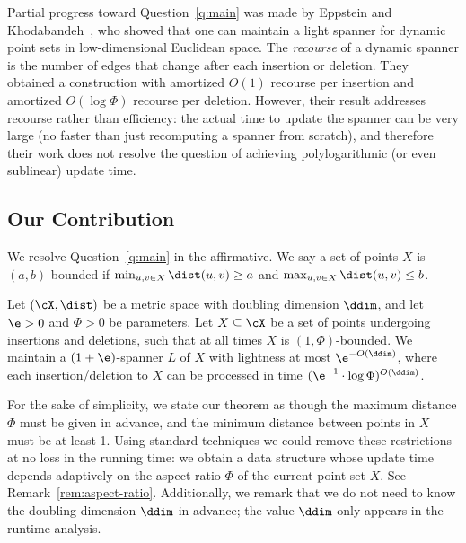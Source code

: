%
%
Partial progress toward Question~\ref{q:main} was made by Eppstein and Khodabandeh~\cite{EK24}, who showed that one can maintain a  light spanner for dynamic point sets in low-dimensional Euclidean space. The \emph{recourse} of a dynamic spanner is the number of edges that change after each insertion or deletion. They obtained a construction with amortized $O(1)$ recourse per insertion and amortized $O(\log \Phi)$ recourse per deletion. However, their result addresses recourse rather than efficiency: the actual time to update the spanner can be very large (no faster than just recomputing a spanner from scratch), and therefore their work does not resolve the question of achieving polylogarithmic (or even sublinear) update time.
%
%
%
%
%
\subsection{Our Contribution}
%
We resolve Question~\ref{q:main} in the affirmative. We say a set of points $X$ is $(a,b)$-bounded if $\min_{u,v \in X} \dist(u,v) \ge a$ and $\max_{u,v \in X} \dist(u,v) \le b$.
\begin{theorem}
\label{thm:main}
    Let $(\cX, \dist)$ be a metric space with doubling dimension $\ddim$, and let $\e >0$ and $\Phi > 0$ be parameters. Let $X \subseteq \cX$ be a set of points undergoing insertions and deletions, such that at all times $X$ is $(1, \Phi)$-bounded. We maintain a $(1+\e)$-spanner $L$ of $X$ with lightness at most $\e^{-O(\ddim)}$, where each insertion/deletion to $X$ can be processed in time $(\e^{-1} \cdot \log \Phi)^{O(\ddim)}$.
\end{theorem}
For the sake of simplicity, we state our theorem as though the maximum distance $\Phi$ must be given in advance, and the minimum distance between points in $X$ must be at least 1. Using standard techniques \cite{KL04,EK24} we could remove these restrictions at no loss in the running time: we obtain a data structure whose update time depends adaptively on the aspect ratio $\Phi$ of the current point set $X$. See Remark~\ref{rem:aspect-ratio}. 
Additionally, we remark that we do not need to know the doubling dimension $\ddim$ in advance; the value $\ddim$ only appears in the runtime analysis.
%

